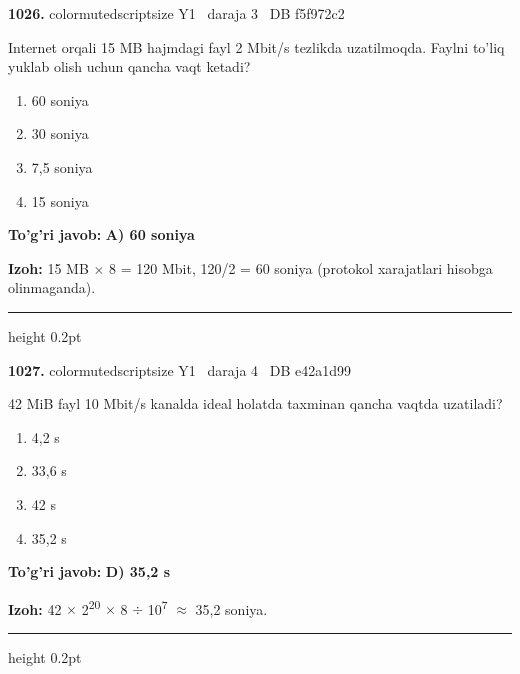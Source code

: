 \documentclass[10pt,a4paper,oneside]{article}
\begin{document}
\noindent\textbf{\color{ink}1026.}  {color{muted}scriptsize Y1 \textbullet\ daraja 3 \textbullet\ DB f5f972c2}
\par
Internet orqali 15 MB hajmdagi fayl 2 Mbit/s tezlikda uzatilmoqda. Faylni to'liq yuklab olish uchun qancha vaqt ketadi?
\begin{enumerate}[label=\Alph*),leftmargin=9mm]
\item 60 soniya
\item 30 soniya
\item 7,5 soniya
\item 15 soniya
\end{enumerate}
\begin{tcolorbox}[enhanced,breakable,colback=teal!4,colframe=teal!50!black,boxrule=0.5pt,arc=1.1mm,left=3mm,right=3mm,top=1.7mm,bottom=1.7mm,before skip=2mm,after skip=2mm]
\textbf{\color{teal}To'g'ri javob:} \textbf{A) 60 soniya}
\par\smallskip
\textbf{Izoh:} 15 MB \ensuremath{\times} 8 = 120 Mbit, 120/2 = 60 soniya (protokol xarajatlari hisobga olinmaganda).
\end{tcolorbox}
\vspace{2mm}\hrule height 0.2pt \vspace{3mm}

\noindent\textbf{\color{ink}1027.}  {color{muted}scriptsize Y1 \textbullet\ daraja 4 \textbullet\ DB e42a1d99}
\par
42 MiB fayl 10 Mbit/s kanalda ideal holatda taxminan qancha vaqtda uzatiladi?
\begin{enumerate}[label=\Alph*),leftmargin=9mm]
\item 4,2 s
\item 33,6 s
\item 42 s
\item 35,2 s
\end{enumerate}
\begin{tcolorbox}[enhanced,breakable,colback=teal!4,colframe=teal!50!black,boxrule=0.5pt,arc=1.1mm,left=3mm,right=3mm,top=1.7mm,bottom=1.7mm,before skip=2mm,after skip=2mm]
\textbf{\color{teal}To'g'ri javob:} \textbf{D) 35,2 s}
\par\smallskip
\textbf{Izoh:} 42 \ensuremath{\times} 2\textsuperscript{2}\textsuperscript{0} \ensuremath{\times} 8 \ensuremath{\div} 10\textsuperscript{7} \ensuremath{\approx} 35,2 soniya.
\end{tcolorbox}
\vspace{2mm}\hrule height 0.2pt \vspace{3mm}
\end{document}
